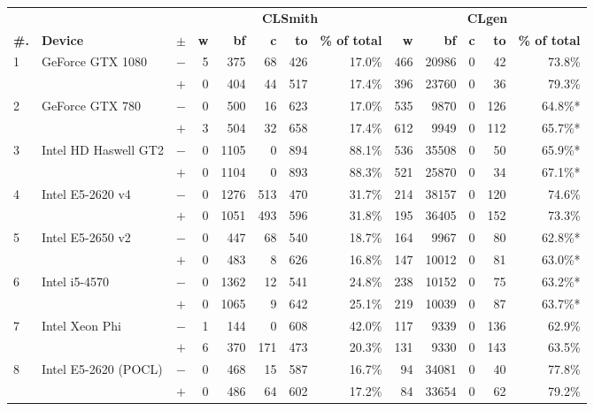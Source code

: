   \begin{tabular}{lll | rrrrr | rrrrr }
  \toprule
  & & & \multicolumn{5}{c|}{\textbf{CLSmith}} & \multicolumn{5}{c}{\textbf{CLgen}} \\
  \textbf{\#.} & \textbf{Device} & $\pm$ &
  \textbf{w} & \textbf{bf} & \textbf{c} & \textbf{to} & \textbf{\% of total} &
  \textbf{w} & \textbf{bf} & \textbf{c} & \textbf{to} & \textbf{\% of total} \\
  \midrule
  \multirow{ 2}{*}{1} & \multirow{ 2}{*}{GeForce GTX 1080} & $-$ & 5 & 375 & 68 & 426 & 17.0\%       & 466 & 20986 & 0 & 42 & 73.8\% \\& & $+$ & 0 & 404 & 44 & 517 & 17.4\% & 396 & 23760 & 0 & 36 & 79.3\% \\
\hline
\multirow{ 2}{*}{2} & \multirow{ 2}{*}{GeForce GTX 780} & $-$ & 0 & 500 & 16 & 623 & 17.0\%       & 535 & 9870 & 0 & 126 & 64.8\%* \\& & $+$ & 3 & 504 & 32 & 658 & 17.4\% & 612 & 9949 & 0 & 112 & 65.7\%* \\
\hline
\multirow{ 2}{*}{3} & \multirow{ 2}{*}{Intel HD Haswell GT2} & $-$ & 0 & 1105 & 0 & 894 & 88.1\%       & 536 & 35508 & 0 & 50 & 65.9\%* \\& & $+$ & 0 & 1104 & 0 & 893 & 88.3\% & 521 & 25870 & 0 & 34 & 67.1\%* \\
\hline
\multirow{ 2}{*}{4} & \multirow{ 2}{*}{Intel E5-2620 v4} & $-$ & 0 & 1276 & 513 & 470 & 31.7\%       & 214 & 38157 & 0 & 120 & 74.6\% \\& & $+$ & 0 & 1051 & 493 & 596 & 31.8\% & 195 & 36405 & 0 & 152 & 73.3\% \\
\hline
\multirow{ 2}{*}{5} & \multirow{ 2}{*}{Intel E5-2650 v2} & $-$ & 0 & 447 & 68 & 540 & 18.7\%       & 164 & 9967 & 0 & 80 & 62.8\%* \\& & $+$ & 0 & 483 & 8 & 626 & 16.8\% & 147 & 10012 & 0 & 81 & 63.0\%* \\
\hline
\multirow{ 2}{*}{6} & \multirow{ 2}{*}{Intel i5-4570} & $-$ & 0 & 1362 & 12 & 541 & 24.8\%       & 238 & 10152 & 0 & 75 & 63.2\%* \\& & $+$ & 0 & 1065 & 9 & 642 & 25.1\% & 219 & 10039 & 0 & 87 & 63.7\%* \\
\hline
\multirow{ 2}{*}{7} & \multirow{ 2}{*}{Intel Xeon Phi} & $-$ & 1 & 144 & 0 & 608 & 42.0\%       & 117 & 9339 & 0 & 136 & 62.9\% \\& & $+$ & 6 & 370 & 171 & 473 & 20.3\% & 131 & 9330 & 0 & 143 & 63.5\% \\
\hline
\multirow{ 2}{*}{8} & \multirow{ 2}{*}{Intel E5-2620 (POCL)} & $-$ & 0 & 468 & 15 & 587 & 16.7\%       & 94 & 34081 & 0 & 40 & 77.8\% \\& & $+$ & 0 & 486 & 64 & 602 & 17.2\% & 84 & 33654 & 0 & 62 & 79.2\% \\

\end{tabular}
